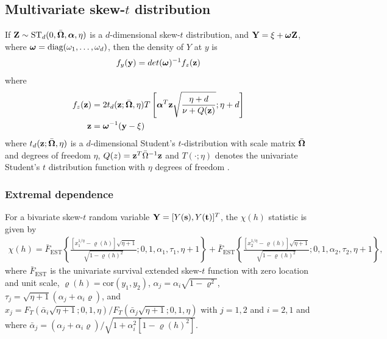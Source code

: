 \documentclass[11pt]{article}
\begin{document}
\subsection*{Multivariate skew-$t$ distribution}
If $\mbox{\bf Z} \sim \text{ST}_d(0, \bar{\mbox{\boldmath $\Omega$}}, \mbox{\boldmath $\alpha$}, \eta)$ is a $d$-dimensional skew-$t$ distribution, and $\mbox{\bf Y} = \xi + \mbox{\boldmath $\omega$} \mbox{\bf Z}$, where $\mbox{\boldmath $\omega$} = \text{diag}(\omega_1, \ldots, \omega_d)$, then the density of $Y$ at $y$ is
\begin{align}
  f_y(\mbox{\bf y}) = det(\mbox{\boldmath $\omega$})^{-1} f_z(\mbox{\bf z})
\end{align}
where
\begin{align}
  f_z(\mbox{\bf z}) &= 2 t_d(\mbox{\bf z}; \bar{\mbox{\boldmath $\Omega$}}, \eta) T \left[ \mbox{\boldmath $\alpha$}^T \mbox{\bf z} \sqrt{ \frac{\eta + d}{\nu + Q(\mbox{\bf z})} }; \eta + d\right] \\
  \mbox{\bf z} &= \mbox{\boldmath $\omega$}^{-1}(\mbox{\bf y} - \xi)
\end{align}
where $t_d(\mbox{\bf z}; \bar{\mbox{\boldmath $\Omega$}}, \eta)$ is a $d$-dimensional Student's $t$-distribution with scale matrix $\bar{\mbox{\boldmath $\Omega$}}$ and degrees of freedom $\eta$, $Q(z) = \mbox{\bf z}^T \bar{\Omega}^{-1}\mbox{\bf z}$ and $T(\cdot; \eta)$ denotes the univariate Student's $t$ distribution function with $\eta$ degrees of freedom \citep{Azzalini2013}.


\subsubsection*{Extremal dependence}
For a bivariate skew-$t$ random variable $\mbox{\bf Y} = [Y(\mbox{\bf s}), Y(\mbox{\bf t})]^T$, the $\chi(h)$ statistic \citep{Padoan2011} is given by
\begin{align}
  \chi(h) = \bar{F}_{\text{EST}}\left\{ \frac{[x_1^{1 / \eta} - \varrho(h)] \sqrt{\eta + 1} }{\sqrt{1 - \varrho(h)^2}}; 0, 1, \alpha_1, \tau_1, \eta + 1 \right\} + \bar{F}_{\text{EST}}\left\{ \frac{ [x_2^{1 / \eta} - \varrho(h)] \sqrt{\eta + 1} }{ \sqrt{1 - \varrho(h)^2} }; 0, 1, \alpha_2, \tau_2, \eta + 1 \right\},
\end{align}
where $\bar{F}_{\text{EST}}$ is the univariate survival extended skew-$t$ function with zero location and unit scale, \hbox{$\varrho(h) = \text{cor}(y_1, y_2)$}, $\alpha_j = \alpha_i \sqrt{1 - \varrho^2}$, $\tau_j = \sqrt{\eta + 1}(\alpha_j + \alpha_i \varrho)$, and $x_j = F_T(\bar{\alpha}_i \sqrt{\eta + 1}; 0, 1, \eta) / F_T(\bar{\alpha}_j \sqrt{\eta + 1}; 0, 1, \eta)$ with $j = 1, 2$ and $i = 2, 1$ and where $\bar{\alpha}_j = (\alpha_j + \alpha_i \varrho) / \sqrt{ 1 + \alpha_i^2 [1 - \varrho(h)^2]}$.
\end{document}
